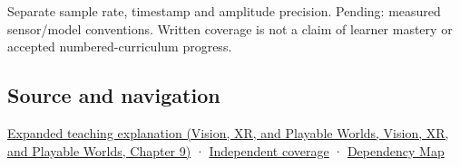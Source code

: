 Separate sample rate, timestamp and amplitude precision. Pending: measured sensor/model conventions. Written coverage is not a claim of learner mastery or accepted numbered-curriculum progress.

\subsection{Source and navigation}\label{appendix-1077ea8fc737-source-and-navigation}

\href{../07-Vision-XR-and-Playable-Worlds/main.pdf\#nameddest=04-visual-computing-ii-ch042-sampling-is-a-question-of-what-remains-distinguishable}{Expanded teaching explanation (Vision, XR, and Playable Worlds, Vision, XR, and Playable Worlds, Chapter 9)} · \hyperref[appendix-fd090d982a15-xr01---independent-seeing-and-representation-source]{Independent coverage} · \hyperref[appendix-4ad47bdd269a]{Dependency Map}
